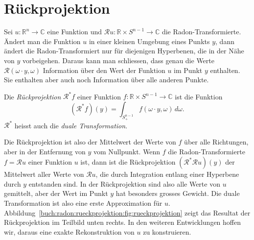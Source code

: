 %
%
%
\section{Rückprojektion
\label{buch:radon:section:rueckprojektion}}
Sei $u\colon \mathbb{R}^n\to\mathbb{C}$ eine Funktion und
$\mathscr{R}u\colon \mathbb{R}\times S^{n-1}\to\mathbb{C}$
die Radon-Transformierte.
Ändert man die Funktion $u$ in einer kleinen Umgebung eines Punkts $y$,
dann ändert die Radon-Transformiert nur für diejenigen Hyperbenen,
die in der Nähe von $y$ vorbeigehen.
Daraus kann man schliessen, dass genau die Werte
$\mathscr{R}(\omega\cdot y,\omega)$ Information über den Wert der
Funktion $u$ im Punkt $y$ enthalten.
Sie enthalten aber auch noch Information über alle anderen Punkte.

\begin{definition}
Die {\em Rückprojektion} $\mathscr{R}^*f$ einer Funktion
$f\colon \mathbb{R}\times S^{n-1}\to\mathbb{C}$ ist die Funktion
\[
(\mathscr{R}^*f)(y)
=
\int_{S_+^{n-1}} f(\omega\cdot y,\omega)\,d\omega.
\]
$\mathscr{R}^*$ heisst auch die {\em duale Transformation}.
\end{definition}

Die Rückprojektion ist also der Mittelwert der Werte von $f$ über
alle Richtungen, aber in der Entfernung von $y$ vom Nullpunkt.
Wenn $f$ die Radon-Transformierte $f=\mathscr{R}u$ einer Funktion $u$
ist, dann ist die Rückprojektion $(\mathscr{R}^*\mathscr{R}u)(y)$
der Mittelwert aller Werte von $\mathscr{R}u$, die durch Integration
entlang einer Hyperbene durch $y$ entstanden sind.
In der Rückprojektion sind also alle Werte von $u$ gemittelt, aber
der Wert im Punkt $y$ hat besonders grosses Gewicht.
Die duale Transformation ist also eine erste Approximation für $u$.
Abbildung~\ref{buch:radon:rueckprojektion:fig:rueckprojektion}
zeigt das Resultat der Rückprojektion im Teilbild unten rechts.
In den weiteren Entwicklungen hoffen wir, daraus eine exakte Rekonstruktion
von $u$ zu konstruieren.

%
%
